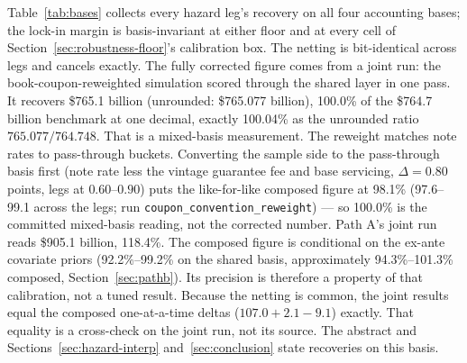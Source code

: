 Table~\ref{tab:bases} collects every hazard leg's recovery on all four accounting bases; the lock-in margin is basis-invariant at either floor and at every cell of Section~\ref{sec:robustness-floor}'s calibration box. The netting is bit-identical across legs and cancels exactly. The fully corrected figure comes from a joint run: the book-coupon-reweighted simulation scored through the shared layer in one pass. It recovers \$765.1 billion (unrounded: \$765.077 billion), 100.0\% of the \$764.7 billion benchmark at one decimal, exactly 100.04\% as the unrounded ratio $765.077/764.748$. That is a mixed-basis measurement. The reweight matches note rates to pass-through buckets. Converting the sample side to the pass-through basis first (note rate less the vintage guarantee fee and base servicing, $\Delta = 0.80$ points, legs at $0.60$--$0.90$) puts the like-for-like composed figure at 98.1\% (97.6--99.1 across the legs; run \texttt{coupon\_convention\_reweight}) --- so 100.0\% is the committed mixed-basis reading, not the corrected number. Path A's joint run reads \$905.1 billion, 118.4\%. The composed figure is conditional on the ex-ante covariate priors (92.2\%--99.2\% on the shared basis, approximately 94.3\%--101.3\% composed, Section~\ref{sec:pathb}). Its precision is therefore a property of that calibration, not a tuned result. Because the netting is common, the joint results equal the composed one-at-a-time deltas ($107.0 + 2.1 - 9.1$) exactly. That equality is a cross-check on the joint run, not its source. The abstract and Sections~\ref{sec:hazard-interp} and~\ref{sec:conclusion} state recoveries on this basis.

